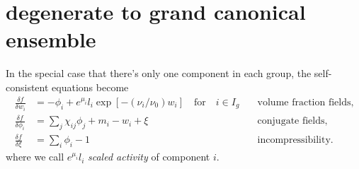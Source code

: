 \documentclass[aps,prl,reprint,onecolumn,groupedaddress,amsmath,amssymb]{revtex4-2}
\begin{document}
\section{degenerate to grand canonical ensemble}
In the special case that there's only one component in each group, the self-consistent equations become
\begin{subequations}
    \begin{align}
        \frac{\delta f}{\delta w_i}    & = -\phi_i + e^{\mu_i} l_i \exp\left[-\left(\nu_i/\nu_0\right) w_i\right]  \quad \text{for} \quad i\in I_g \quad & \text{volume fraction fields,} \\
        \frac{\delta f}{\delta \phi_i} & = \sum_j \chi_{ij} \phi_j + m_i -w_i + \xi     \quad                                                                                                & \text{conjugate fields,}       \\
        \frac{\delta f}{\delta \xi}    & = \sum_i \phi_i -1     \quad                                                                                                                        & \text{incompressibility.}
    \end{align}
\end{subequations}
where we call $e^{\mu_i} l_i$ \emph{scaled activity} of component $i$.
\end{document}
